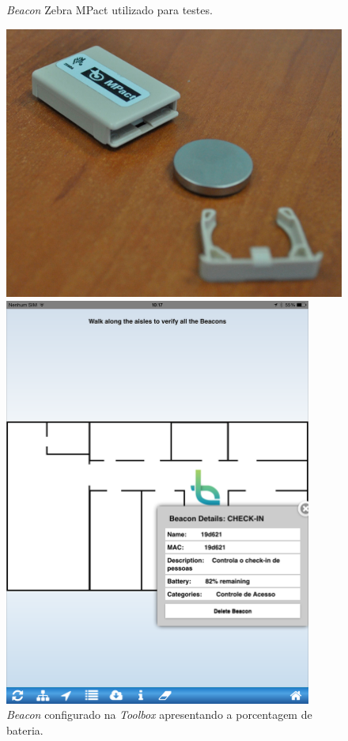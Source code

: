 \begin{figure}[htb]
	\label{teste}
	\centering
 	\begin{minipage}{0.40\textwidth}
		\centering
		\caption{\label{fig:zebra-mpact}\textit{Beacon} Zebra MPact utilizado para testes.}
		\includegraphics[width=1\textwidth]{img/beacon-mpact2.jpg}
	\end{minipage}
	\hfill
	\begin{minipage}{0.47\textwidth}
		\centering
		\caption{\label{fig:exemplo-toolbox}\textit{Beacon} configurado na \textit{Toolbox} apresentando a porcentagem de bateria.}
		\includegraphics[width=0.9\textwidth]{img/toolbox-exemplo.png}
	\end{minipage}
\end{figure}

